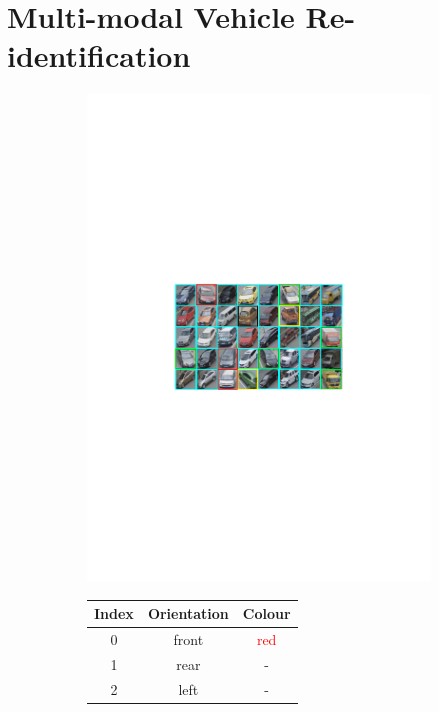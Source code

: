 \documentclass[10pt,twocolumn,letterpaper]{article}
\begin{document}
\section{Multi-modal Vehicle Re-identification}
\begin{figure}
  \begin{subfigure}{.6\textwidth}
    \includegraphics[width=\linewidth,trim=5cm 11cm 5cm 11cm,clip=true]{images/veri_orients.pdf}
  \end{subfigure}
  \begin{subfigure}{.4\textwidth}
    \centering
    \begin{tabular}{c | c | c}
      \hline
      Index & Orientation & Colour \\
      \hline
      0 & front & \textcolor{red}{red} \\
      1 & rear & -  \\
      2 & left  & - \\

\end{tabular}
\end{subfigure}
\end{figure}
\end{document}
